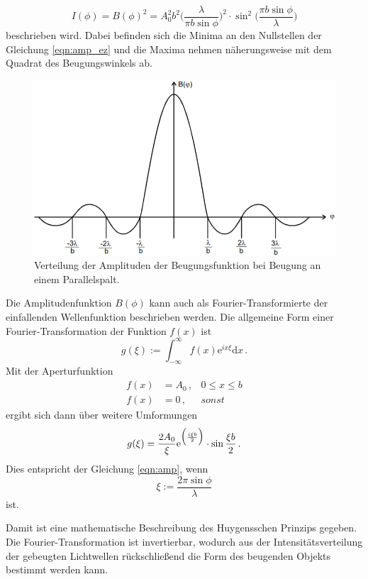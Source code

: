 \begin{equation}
    I(\phi) = B(\phi)^2 = A_0^2 b^2 \Biggl(\frac{\lambda}{\pi b \sin\phi}\Biggr)^2 \cdot \sin^2\Biggl(\frac{\pi b\sin\phi}{\lambda}\Biggr)
    \label{eqn:aus}
\end{equation}
beschrieben wird. Dabei befinden sich die Minima an den Nullstellen der Gleichung \ref{eqn:amp_ez} und die Maxima nehmen näherungsweise 
mit dem Quadrat des Beugungswinkels ab. 
\begin{figure}
    \centering
    \includegraphics[width=\textwidth]{data/amp_verteilung.png}
    \caption{Verteilung der Amplituden der Beugungsfunktion bei Beugung an einem Parallelspalt.}
    \label{fig:int_vert}
\end{figure}

Die Amplitudenfunktion $B(\phi)$ kann auch als Fourier-Transformierte der einfallenden Wellenfunktion beschrieben werden. 
Die allgemeine Form einer Fourier-Transformation der Funktion $f(x) $ ist 
\begin{equation}
    g(\xi) := \int_{-\infty}^\infty f(x)\mathrm{e}^{i x \xi} \mathrm{d}x\,.
\end{equation}
Mit der Aperturfunktion 
\begin{align}
    f(x) &= A_0\,,& 0\leq x\leq b\\
    f(x) &= 0\,,& sonst 
\end{align}
ergibt sich dann über weitere Umformungen
\begin{equation}
    g(\xi) = \frac{2A_0}{\xi} \mathrm{e}^{\Bigl(\frac{i\xi b}{2}\Bigr)}\cdot\sin\frac{\xi b}{2}\,.
\end{equation}
Dies entspricht der Gleichung \ref{eqn:amp}, wenn 
\begin{equation}
    \xi := \frac{2\pi\sin\phi}{\lambda}
\end{equation}
ist.

Damit ist eine mathematische Beschreibung des Huygensschen Prinzips gegeben. Die Fourier-Transformation ist invertierbar, wodurch aus der 
Intensitätsverteilung der gebeugten Lichtwellen rückschließend die Form des beugenden Objekts bestimmt werden kann. 